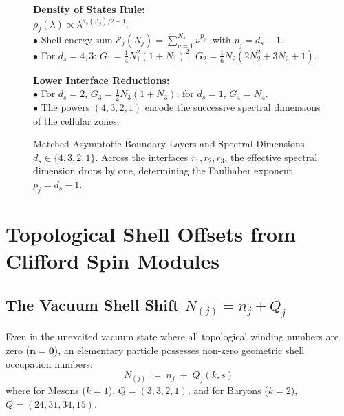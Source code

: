 \documentclass[
    12pt,
    a4paper,
    headings=normal,
    twoside=false,
    open=any,
    parskip=half
]{scrbook}
\begin{document}
\begin{figure}[htbp]
\begin{tcolorbox}[colback=white, colframe=secondarycolor!70, arc=2mm, boxrule=0.7pt, left=6pt, right=6pt, top=4pt, bottom=4pt, width=\linewidth]
\scriptsize\sffamily
\begin{minipage}[t]{0.48\textwidth}
  \textbf{\color{maincolor}Density of States Rule:}\\[1pt]
  $\rho_j(\lambda) \propto \lambda^{d_s(\mathcal{Z}_j)/2 - 1}$.\\[2pt]
  $\bullet$ Shell energy sum $\mathcal{E}_j(N_j) = \sum_{\nu=1}^{N_j} \nu^{p_j}$, with $p_j=d_s-1$.\\[1pt]
  $\bullet$ For $d_s=4,3$: $G_1=\frac14N_1^2(1+N_1)^2$, $G_2=\frac16N_2(2N_2^2+3N_2+1)$.
\end{minipage}\hfill
\begin{minipage}[t]{0.48\textwidth}
  \textbf{\color{accentcolor}Lower Interface Reductions:}\\[1pt]
  $\bullet$ For $d_s=2$, $G_3=\frac12N_3(1+N_3)$; for $d_s=1$, $G_4=N_4$.\\[1pt]
  $\bullet$ The powers $(4,3,2,1)$ encode the successive spectral dimensions of the cellular zones.
\end{minipage}
\end{tcolorbox}
\vspace{-2mm}
\caption{Matched Asymptotic Boundary Layers and Spectral Dimensions $d_s \in \{4,3,2,1\}$. Across the interfaces $r_1,r_2,r_3$, the effective spectral dimension drops by one, determining the Faulhaber exponent $p_j=d_s-1$.}
\label{fig:ch3_matched_asymptotics_zones}
\end{figure}

\section{Topological Shell Offsets from Clifford Spin Modules}
\label{sec:ch3_clifford_offsets_derivation}

\subsection{The Vacuum Shell Shift $N_{(j)} = n_j + Q_j$}

Even in the unexcited vacuum state where all topological winding numbers are zero ($\mathbf{n} = \mathbf{0}$), an elementary particle possesses non-zero geometric shell occupation numbers:
\begin{equation}
N_{(j)} \;\coloneqq\; n_j \;+\; Q_j(k, s)
\label{eq:ch3_offset_shift_definition}
\end{equation}
where for Mesons ($k = 1$), $Q = (3, 3, 2, 1)$, and for Baryons ($k = 2$), $Q = (24, 31, 34, 15)$.
\end{document}
